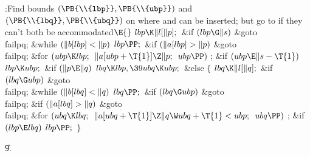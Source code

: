 \Y\B\4:Find bounds $(\PB{\\{lbp}},\PB{\\{ubp}})$ and $(\PB{\\{lbq}},\PB{%
\\{ubq}})$ on where  and  can be inserted; but go to  if they can't both be accommodated\X${}\E{}$\6
$\\{lbp}\K\|l[\|p];{}$\6
\&{if} ${}(\\{lbp}\G\|s){}$\1\5
\&{goto} \\{failpq};\2\6
\&{while} ${}(\|b[\\{lbp}]<\|p){}$\1\5
${}\\{lbp}\PP;{}$\2\6
\&{if} ${}(\|a[\\{lbp}]>\|p){}$\1\5
\&{goto} \\{failpq};\2\6
\&{for} ${}(\\{ubp}\K\\{lbp};{}$ ${}\|a[\\{ubp}+\T{1}]\Z\|p;{}$ ${}\\{ubp}%
\PP){}$\1\5
;\2\6
\&{if} ${}(\\{ubp}\E\|s-\T{1}){}$\1\5
${}\\{lbp}\K\\{ubp};{}$\2\6
\&{if} ${}(\|p\E\|q){}$\1\5
${}\\{lbq}\K\\{lbp},\39\\{ubq}\K\\{ubp};{}$\2\6
\&{else}\5
${}\{{}$\1\6
${}\\{lbq}\K\|l[\|q];{}$\6
\&{if} ${}(\\{lbq}\G\\{ubp}){}$\1\5
\&{goto} \\{failpq};\2\6
\&{while} ${}(\|b[\\{lbq}]<\|q){}$\1\5
${}\\{lbq}\PP;{}$\2\6
\&{if} ${}(\\{lbq}\G\\{ubp}){}$\1\5
\&{goto} \\{failpq};\2\6
\&{if} ${}(\|a[\\{lbq}]>\|q){}$\1\5
\&{goto} \\{failpq};\2\6
\&{for} ${}(\\{ubq}\K\\{lbq};{}$ ${}\|a[\\{ubq}+\T{1}]\Z\|q\W\\{ubq}+\T{1}<%
\\{ubp};{}$ ${}\\{ubq}\PP){}$\1\5
;\2\6
\&{if} ${}(\\{lbp}\E\\{lbq}){}$\1\5
${}\\{lbp}\PP;{}$\2\6
\4${}\}{}$\2\par
\U9.\fi

